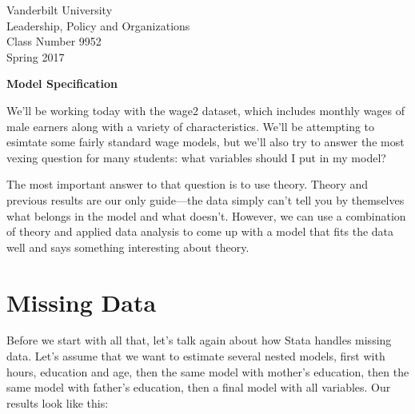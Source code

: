 \documentclass[12pt]{article}
\begin{document}
\thispagestyle{empty}%


\setlength{\parskip}{1ex plus 0.5ex minus 0.2ex}

\setcounter{secnumdepth}{-2}



\begin{flushleft}
Vanderbilt University\\Leadership, Policy and Organizations\\Class Number 9952\\ Spring 2017
\end{flushleft}

\begin{center}
\textbf{Model Specification}
\end{center}

We'll be working today with the wage2 dataset, which includes monthly
wages of male earners along with a variety of characteristics. We'll
be attempting to esimtate some fairly standard wage models, but we'll
also try to answer the most vexing question for many students: what
variables should I put in my model?

The most important answer to that question is to use theory. Theory
and previous results are our only guide---the data simply can't tell
you by themselves what belongs in the model and what doesn't. However,
we can  use a combination of theory and applied data analysis to come
up with a model that fits the data well and says something interesting
about theory. 

\section{Missing Data}
\label{sec:missing-data}

Before we start with all that, let's talk again about how Stata
handles missing data. Let's assume that we want to estimate several
nested models, first with hours, education and age, then the same
model with mother's education, then the same model with father's
education, then a final model with all variables. Our results look
like this: 
\end{document}
